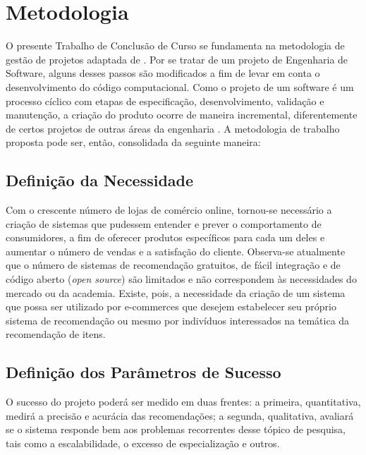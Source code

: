 \chapter[Metodologia]{Metodologia}
\label{chap:metodologia}

O presente Trabalho de Conclusão de Curso se fundamenta na metodologia de gestão de projetos adaptada de \cite{pmbok}. Por se tratar de um projeto de Engenharia de Software, alguns desses passos são modificados a fim de levar em conta o desenvolvimento do código computacional. Como o projeto de um software é um processo cíclico com etapas de especificação, desenvolvimento, validação e manutenção, a criação do produto ocorre de maneira incremental, diferentemente de certos projetos de outras áreas da engenharia \cite{iterative-development}. A metodologia de trabalho proposta pode ser, então, consolidada da seguinte maneira: 

\section{Definição da Necessidade} %
\label{sec:defini_o_da_necessidade}


Com o crescente número de lojas de comércio online, tornou-se necessário a criação de sistemas que pudessem entender e prever o comportamento de consumidores, a fim de oferecer produtos específicos para cada um deles e aumentar o número de vendas e a satisfação do cliente. Observa-se atualmente que o número de sistemas de recomendação gratuitos, de fácil integração e de código aberto (\textit{open source}) são limitados e não correspondem às necessidades do mercado ou da academia. Existe, pois, a necessidade da criação de um sistema que possa ser utilizado por e-commerces que desejem estabelecer seu próprio sistema de recomendação ou mesmo por indivíduos interessados na temática da recomendação de itens.

\section{Definição dos Parâmetros de Sucesso} %
\label{sec:defini_o_dos_par_metros_de_sucesso}


O sucesso do projeto poderá ser medido em duas frentes: a primeira, quantitativa, medirá a precisão e acurácia das recomendações; a segunda, qualitativa, avaliará se o sistema responde bem aos problemas recorrentes desse tópico de pesquisa, tais como a escalabilidade, o excesso de especialização e outros. 


